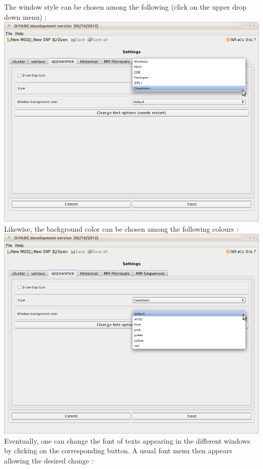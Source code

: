The window style can be chosen among the following (click on the upper
drop down menu) :\\


\includegraphics[scale=0.33]{gui_pictures/Capture-DIYABC-99} \\


Likewise, the background color can be chosen among the following colours
:\\


\includegraphics[scale=0.33]{gui_pictures/Capture-DIYABC-100} \\


Eventually, one can change the font of texts appearing in the different
windows by clicking on the corresponding button. A usual font menu
then appears allowing the desired change :\\


